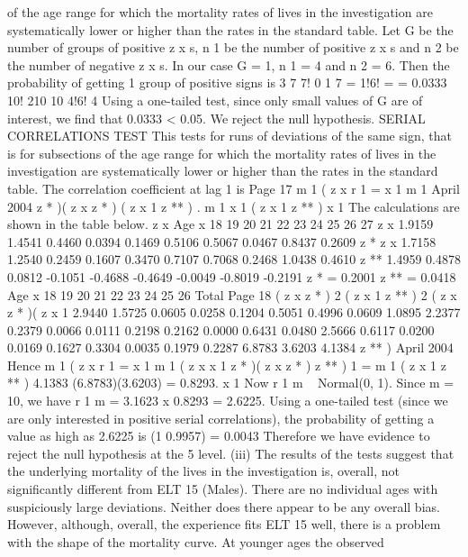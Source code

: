 \documentclass[a4paper,12pt]{article}
\begin{document}
of the age range for which the mortality rates of lives in the
investigation are systematically lower or higher than the rates in the
standard table.
Let G be the number of groups of positive z x s, n 1 be the number of
positive z x s and n 2 be the number of negative z x s.
In our case G = 1, n 1 = 4 and n 2 = 6.
Then the probability of getting 1 group of positive signs is
3
7
7!
0 1
7
= 1!6! =
= 0.0333
10! 210
10
4!6!
4
Using a one-tailed test, since only small values of G are of interest, we
find that 0.0333 < 0.05.
We reject the null hypothesis.
SERIAL CORRELATIONS TEST
This tests for runs of deviations of the same sign, that is for subsections
of the age range for which the mortality rates of lives in the
investigation are systematically lower or higher than the rates in the
standard table.
The correlation coefficient at lag 1 is
Page 17 %
m 1
( z x
r 1 =
x 1
m 1
April 2004
z * )( z x
z * )
( z x
1
z ** )
.
m 1
x 1
( z x
1
z ** )
x 1
The calculations are shown in the table below.
z x
Age
x
18
19
20
21
22
23
24
25
26
27
z x
1.9159
1.4541
0.4460
0.0394
0.1469
0.5106
0.5067
0.0467
0.8437
0.2609
z *
z x
1.7158
1.2540
0.2459
0.1607
0.3470
0.7107
0.7068
0.2468
1.0438
0.4610
z **
1.4959
0.4878
0.0812
-0.1051
-0.4688
-0.4649
-0.0049
-0.8019
-0.2191
z * = 0.2001
z ** =
0.0418
Age
x
18
19
20
21
22
23
24
25
26
Total
Page 18
( z x
z * ) 2
( z x
1
z ** ) 2
( z x
z * )( z x
1
2.9440
1.5725
0.0605
0.0258
0.1204
0.5051
0.4996
0.0609
1.0895 2.2377
0.2379
0.0066
0.0111
0.2198
0.2162
0.0000
0.6431
0.0480 2.5666
0.6117
0.0200
0.0169
0.1627
0.3304
0.0035
0.1979
0.2287
6.8783 3.6203 4.1384
z ** ) %
April 2004
Hence
m 1
( z x
r 1 =
x 1
m 1
( z x
x 1
z * )( z x
z * )
z ** )
1
=
m 1
( z x
1
z ** )
4.1383
(6.8783)(3.6203)
= 0.8293.
x 1
Now r 1 m ~ Normal(0, 1).
Since m = 10, we have r 1 m = 3.1623 x 0.8293 = 2.6225.
Using a one-tailed test (since we are only interested in positive serial
correlations), the probability of getting a value as high as 2.6225 is
(1 0.9957) = 0.0043
Therefore we have evidence to reject the null hypothesis at the 5%
level.
(iii)
The results of the tests suggest that the underlying mortality of the lives in the
investigation is, overall, not significantly different from ELT 15 (Males).
There are no individual ages with suspiciously large deviations.
Neither does there appear to be any overall bias.
However, although, overall, the experience fits ELT 15 well, there is a
problem with the shape of the mortality curve. At younger ages the observed
\end{document}
